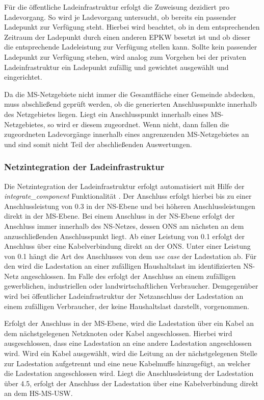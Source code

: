 Für die öffentliche Ladeinfrastruktur erfolgt die Zuweisung dezidiert pro Ladevorgang.
So wird je Ladevorgang untersucht, ob bereits ein passender Ladepunkt zur Verfügung steht.
Hierbei wird beachtet, ob in dem entsprechenden Zeitraum der Ladepunkt durch einen anderen \gls{EPKW} besetzt ist und ob dieser die entsprechende Ladeleistung zur Verfügung stellen kann.
Sollte kein passender Ladepunkt zur Verfügung stehen, wird analog zum Vorgehen bei der privaten Ladeinfrastruktur ein Ladepunkt zufällig und gewichtet ausgewählt und eingerichtet.

Da die \gls{MS}-Netzgebiete nicht immer die Gesamtfläche einer Gemeinde abdecken, muss abschließend geprüft werden, ob die generierten Anschlusspunkte innerhalb des Netzgebietes liegen.
Liegt ein Anschlusspunkt innerhalb eines \gls{MS}-Netzgebietes, so wird er diesem zugeordnet.
Wenn nicht, dann fallen die zugeordneten Ladevorgänge innerhalb eines angrenzenden \gls{MS}-Netzgebietes an und sind somit nicht Teil der abschließenden Auswertungen.


\subsubsection{Netzintegration der Ladeinfrastruktur}

Die Netzintegration der Ladeinfrastruktur erfolgt automatisiert mit Hilfe der \textit{integrate\_component} Funktionalität .
Der Anschluss erfolgt hierbei bis zu einer Anschlussleistung von \SI{0.3}{\mva} in der \gls{NS}-Ebene und bei höheren Anschlussleistungen direkt in der \gls{MS}-Ebene.
Bei einem Anschluss in der \gls{NS}-Ebene erfolgt der Anschluss immer innerhalb des \gls{NS}-Netzes, dessen \gls{ONS} am nächsten an dem anzuschließenden Anschlusspunkt liegt.
Ab einer Leistung von \SI{0.1}{\mva} erfolgt der Anschluss über eine Kabelverbindung direkt an der \gls{ONS}.
Unter einer Leistung von \SI{0.1}{\mva} hängt die Art des Anschlusses von dem \textit{use case} der Ladestation ab.
Für den \UC \zH wird die Ladestation an einer zufälligen Haushaltslast im identifizierten \gls{NS}-Netz angeschlossen.
Im Falle des \UC \Firmeparkplatz erfolgt der Anschluss an einem zufälligen gewerblichen, industriellen oder landwirtschaftlichen Verbraucher.
Demgegenüber wird bei öffentlicher Ladeinfrastruktur der Netzanschluss der Ladestation an einem zufälligen Verbraucher, der keine Haushaltslast darstellt, vorgenommen.\medskip

Erfolgt der Anschluss in der \gls{MS}-Ebene, wird die Ladestation über ein Kabel an dem nächstgelegenen Netzknoten oder Kabel angeschlossen.
Hierbei wird ausgeschlossen, dass eine Ladestation an eine andere Ladestation angeschlossen wird.
Wird ein Kabel ausgewählt, wird die Leitung an der nächstgelegenen Stelle zur Ladestation aufgetrennt und eine neue Kabelmuffe hinzugefügt, an welcher die Ladestation angeschlossen wird.
Liegt die Anschlussleistung der Ladestation über \SI{4.5}{\mva}, erfolgt der Anschluss der Ladestation über eine Kabelverbindung direkt an dem \gls{HS}-\gls{MS}-\gls{USW}.

